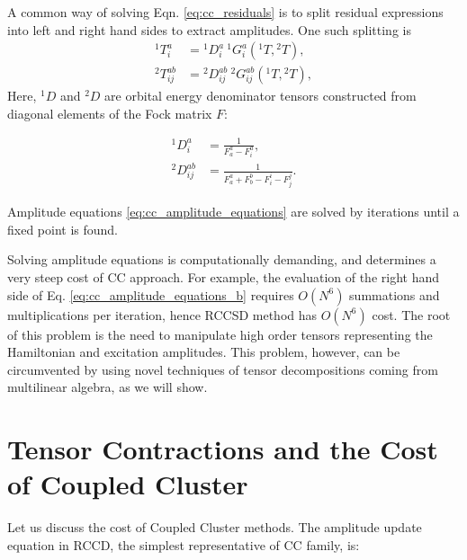 A common way of solving Eqn. \ref{eq:cc_residuals} is to split residual 
expressions into left and right hand sides to extract amplitudes. One such 
splitting is
\begin{subequations}
\begin{align}
 {}^{1}T_{i}^{a} &= {}^{1}D_{i}^{a} ~ {}^{1}G_{i}^{a}({}^{1}T, {}^{2}T), \\
{}^{2}T_{ij}^{ab} &= {}^{2}D_{ij}^{ab} ~ {}^{2}G_{ij}^{ab}({}^{1}T, {}^{2}T), 
\label{eq:cc_amplitude_equations_b}
\end{align}
\label{eq:cc_amplitude_equations}
\end{subequations}
Here, ${}^1D$ and ${}^2D$ are orbital energy
denominator tensors constructed from diagonal elements of the Fock matrix
$F$:

\begin{subequations}
\begin{align} {}^1D_i^a &= \frac{1}{F_a^a - F_i^a}, \\
{}^{2}D_{ij}^{ab} &= \frac{1}{F_{a}^{a} + F_{b}^{b} - F_{i}^{i} -
F_{j}^{j}}.
\end{align}
\label{eq:cc_denom_definition}
\end{subequations} 

Amplitude equations \ref{eq:cc_amplitude_equations} are solved by iterations 
until a fixed point is found.

Solving amplitude equations is computationally demanding, and determines a 
very steep cost of CC approach. For example, the evaluation of 
the right hand side of Eq. \ref{eq:cc_amplitude_equations_b} requires 
$O(N^6)$ summations and multiplications per iteration, hence RCCSD method has 
$O(N^6)$ cost. The root of this problem is the need to manipulate high order 
tensors representing the Hamiltonian and excitation amplitudes. This problem, 
however, can be circumvented by using novel techniques of tensor 
decompositions coming from multilinear algebra,\cite{kolda2009tensor} as we 
will show. 

\section{Tensor Contractions and the Cost of Coupled Cluster}
Let us discuss the cost of Coupled Cluster methods. The amplitude update 
equation in RCCD, the simplest representative of CC family, is:

